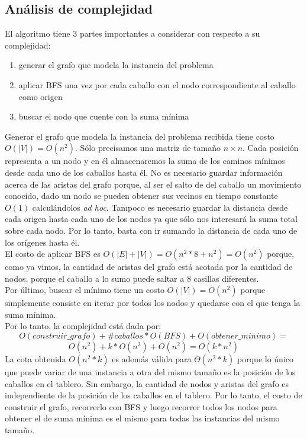 \subsection{Análisis de complejidad}
El algoritmo tiene 3 partes importantes a considerar con respecto a su complejidad:
\begin{enumerate}
  \item generar el grafo que modela la instancia del problema
  \item aplicar BFS una vez por cada caballo con el nodo correspondiente al caballo como origen
  \item buscar el nodo que cuente con la suma mínima
\end{enumerate}
Generar el grafo que modela la instancia del problema recibida tiene costo $O(\left\vert{V}\right\vert) = O(n^2)$. 
Sólo precisamos una matriz de tamaño $n \times n$. Cada posición representa a un nodo y en él almacenaremos la suma
de los caminos mínimos desde cada uno de los caballos hasta él. No es necesario guardar información acerca de las
aristas del grafo porque, al ser el salto de del caballo un movimiento conocido, dado un nodo se pueden obtener sus vecinos
en tiempo constante $O(1)$ calculándolos \textit{ad hoc}.
Tampoco es necesario guardar la distancia desde cada origen hasta cada uno de los nodos ya que sólo nos interesará
la suma total sobre cada nodo. Por lo tanto, basta con ir sumando la distancia de cada uno de los orígenes hasta él.\\
El costo de aplicar BFS es $O(\left\vert{E}\right\vert + \left\vert{V}\right\vert) = O(n^2 * 8 + n^2) = O(n^2)$ \cite[p.~597]{cormen} porque, 
como ya vimos, la cantidad de aristas del grafo está acotada por la cantidad de nodos, porque el caballo a lo sumo
puede saltar a 8 casillas diferentes.\\
Por último, buscar el mínimo tiene un costo $O(\left\vert{V}\right\vert) = O(n^2)$ porque simplemente consiste
en iterar por todos los nodos y quedarse con el que tenga la suma mínima.\\
Por lo tanto, la complejidad está dada por:
\begin{displaymath}
  O(construir\_grafo) + \#caballos * O(BFS) + O(obtener\_minimo) = 
\end{displaymath}
\begin{displaymath}
  O(n^2) + k * O(n^2) + O(n^2) = O(k * n^2)
\end{displaymath}
La cota obtenida $O(n^2 * k)$ es además válida para $\Theta (n^2 * k)$ porque lo único que puede variar de una
instancia a otra del mismo tamaño es la posición de los caballos en el tablero. Sin embargo, la cantidad de nodos
y aristas del grafo es independiente de la posición de los caballos en el tablero. Por lo tanto, el costo de
construir el grafo, recorrerlo con BFS y luego recorrer todos los nodos para obtener el de suma mínima
es el mismo para todas las instancias del mismo tamaño.


